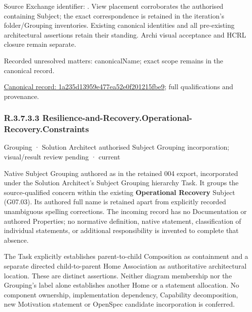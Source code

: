 Source Exchange identifier: \texttt{}. View placement corroborates
the authorised containing Subject; the exact correspondence is retained in the
iteration's folder/Grouping inventories. Existing canonical identities and all
pre-existing architectural assertions retain their standing. Archi visual
acceptance and HCRL closure remain separate.


{\small Recorded unresolved matters: canonicalName; exact scope remains in the canonical record.}\par
{\footnotesize \href{../../../../continuum/grouping/1a235d13959e477ea52e0f201215fbe9.md}{Canonical record: 1a235d13959e477ea52e0f201215fbe9}; full qualifications and provenance.}\par
\subsubsection*{R.3.7.3.3 Resilience-and-Recovery.Operational-Recovery.Constraints}
\label{navigation:R.3.7.3.3}

\label{element:df0b38c3ba9c49ea8dfe3f032ad2a329}
{\small Grouping · Solution Architect authorised Subject Grouping incorporation; visual/result review pending · current}\par

Native Subject Grouping authored as \texttt{} in the retained 004 export,
incorporated under the Solution Architect's Subject Grouping hierarchy Task.
It groups the source-qualified \texttt{} concern within
the existing \textbf{Operational Recovery} Subject (G07.03). Its authored full name
is retained apart from explicitly recorded unambiguous spelling corrections.
The incoming record has no Documentation or authored Properties; no normative
definition, native statement, classification of individual statements, or
additional responsibility is invented to complete that absence.



The Task explicitly establishes parent-to-child Composition as containment and
a separate directed child-to-parent Home Association as authoritative architectural
location. These are distinct assertions. Neither diagram membership nor the
Grouping's label alone establishes another Home or a statement allocation.
No component ownership, implementation dependency, Capability decomposition,
new Motivation statement or OpenSpec candidate incorporation is conferred.



